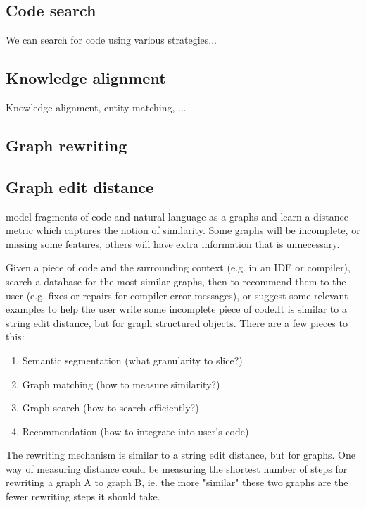 \documentclass[11pt]{article}
\begin{document}
    \subsection{Code search}

    We can search for code using various strategies...

    \subsection{Knowledge alignment}

    Knowledge alignment, entity matching, ...

    \subsection{Graph rewriting}

    \subsection{Graph edit distance}

    model fragments of code and natural language as a graphs and learn a distance metric which captures the notion of similarity. Some graphs will be incomplete, or missing some features, others will have extra information that is unnecessary.

    Given a piece of code and the surrounding context (e.g. in an IDE or compiler), search a database for the most similar graphs, then to recommend them to the user (e.g. fixes or repairs for compiler error messages), or suggest some relevant examples to help the user write some incomplete piece of code.It is similar to a string edit distance, but for graph structured objects. There are a few pieces to this:

    \begin{enumerate}
    \item Semantic segmentation (what granularity to slice?)
    \item Graph matching (how to measure similarity?)
    \item Graph search (how to search efficiently?)
    \item Recommendation (how to integrate into user's code)
    \end{enumerate}

    The rewriting mechanism is similar to a string edit distance, but for graphs. One way of measuring distance could be measuring the shortest number of steps for rewriting a graph A to graph B, ie. the more "similar" these two graphs are the fewer rewriting steps it should take.
\end{document}
